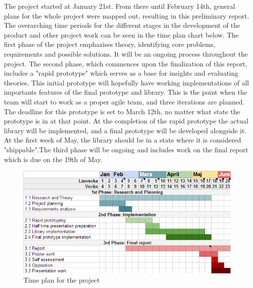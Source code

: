 The project started at January 21st. From there until February 14th, general plans for the whole project were mapped out, resulting in this preliminary report. The overarching time periods for the different stages in the development of the product and other project work can be seen in the time plan chart below. The first phase of the project emphazises theory, identifying core problems, requirements and possible solutions. It will be an ongoing process throughout the project. 
The second phase, which commences upon the finalization of this report, includes a "rapid prototype" which serves as a base for insights and evaluating theories. This initial prototype will hopefully have working implementations of all importants features of the final prototype and library.  This is the point when the team will start to work as a proper agile team, and three iterations are planned. The deadline for this prototype is set to March 12th, no matter what state the prototype is in at that point.
At the completion of the rapid prototype the actual library will be implemented, and a final prototype will be developed alongside it. At the first week of May, the library should be in a state where it is considered "shippable".The third phase will be ongoing and includes work on the final report which is due on the 19th of May.  

\begin{figure}[h]
\centering
\includegraphics[width=\textwidth,height=0.2\paperheight,keepaspectratio
]{figures/time-plan}
\caption{Time plan for the project}
\label{fig:timeplan}
\end{figure}